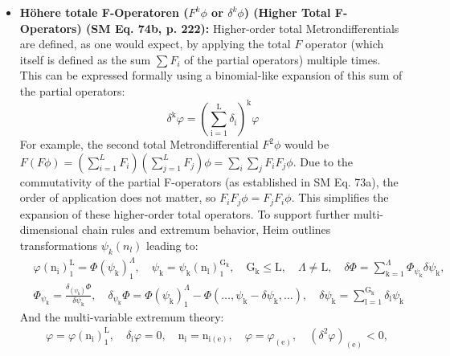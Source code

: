 \documentclass[12pt]{article}
\begin{document}
\begin{itemize}
    \item \textbf{Höhere totale F-Operatoren (\( F^k\phi \) or \( \delta^k\phi \)) (Higher Total F-Operators) (SM Eq. 74b, p. 222):}
    Higher-order total Metrondifferentials are defined, as one would expect, by applying the total \( F \) operator (which itself is defined as the sum \( \sum F_i \) of the partial operators) multiple times. This can be expressed formally using a binomial-like expansion of this sum of the partial operators:
    \begin{equation}
    \delta^\mathrm{k}\varphi = \left( \sum_{\mathrm{i}=1}^\mathrm{L} \delta_{\mathrm{i}} \right)^\mathrm{k} \varphi \tag{74b}
    \end{equation}
    For example, the second total Metrondifferential \( F^2\phi \) would be \( F(F\phi) = (\sum_{i=1}^L F_i)(\sum_{j=1}^L F_j)\phi = \sum_i \sum_j F_i F_j \phi \). Due to the commutativity of the partial F-operators (as established in SM Eq. 73a), the order of application does not matter, so \( F_i F_j \phi = F_j F_i \phi \). This simplifies the expansion of these higher-order total operators.
    To support further multi-dimensional chain rules and extremum behavior, Heim outlines transformations \(\psi_k(n_l)\) leading to:
    \begin{equation}
    \begin{aligned}
    & \varphi(\mathrm{n_i})_1^\mathrm{L} = \Phi(\psi_\mathrm{k})_1^\Lambda, \quad \psi_\mathrm{k} = \psi_\mathrm{k}(\mathrm{n_l})_1^{\mathrm{G_k}}, \quad \mathrm{G_k} \le \mathrm{L}, \quad \Lambda \neq \mathrm{L}, \quad \delta\Phi = \sum_{\mathrm{k}=1}^\Lambda \Phi_{\psi_\mathrm{k}} \delta\psi_\mathrm{k}, \\
    & \Phi_{\psi_\mathrm{k}} = \frac{\delta_{(\psi_\mathrm{k})}\Phi}{\delta\psi_\mathrm{k}}, \quad \delta_{\psi_\mathrm{k}}\Phi = \Phi(\psi_\mathrm{k})_1^\Lambda - \Phi(\dots, \psi_\mathrm{k} - \delta\psi_\mathrm{k}, \dots), \quad \delta\psi_\mathrm{k} = \sum_{\mathrm{l}=1}^{\mathrm{G_k}} \delta_{\mathrm{l}}\psi_\mathrm{k}
    \end{aligned} \tag{75}
    \end{equation}
    And the multi-variable extremum theory:
    \begin{equation}
    \begin{aligned}
    & \varphi = \varphi(\mathrm{n_i})_1^\mathrm{L}, \quad \delta_{\mathrm{i}}\varphi = 0, \quad \mathrm{n_i} = \mathrm{n}_{\mathrm{i(e)}}, \quad \varphi = \varphi_{(\mathrm{e})}, \quad \left(\delta^2\varphi\right)_{(\mathrm{e})} < 0, \\

\end{aligned}
\end{equation}
\end{itemize}
\end{document}
